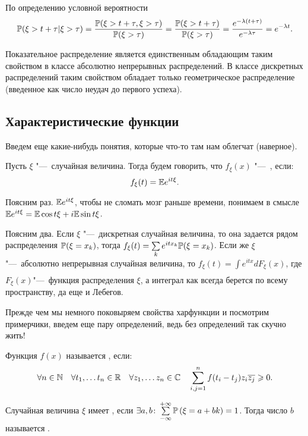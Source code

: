 \documentclass[../TV&MS.tex]{subfiles}
\begin{document}
	По определению условной вероятности
	$$\mathbb{P}(\xi > t + \tau | \xi > \tau) = \frac{\mathbb{P}(\xi > t + \tau, \xi > \tau)}{\mathbb{P}(\xi > \tau)} = 
	\frac{\mathbb{P}(\xi > t + \tau)}{\mathbb{P}(\xi > \tau)} = \frac{e^{-\lambda(t+\tau)}}{e^{-\lambda \tau}} = 
	e^{-\lambda t}.$$

	Показательное распределение является единственным обладающим таким свойством в классе абсолютно 
	непрерывных распределений. В классе дискретных распределений таким свойством обладает только 
	геометрическое распределение (введенное как число неудач до первого успеха).
	
\subsection{Характеристические функции}

	Введем еще какие-нибудь понятия, которые что-то там нам облегчат (наверное).

\begin{Def}
    Пусть $\xi$ "---~случайная величина. Тогда будем говорить, что 
    $f_\xi \left( x \right) $ "---~, если:
    \[
        f_\xi(t) = \mathbb{E} e^{it\xi}.
    \] 
\end{Def} 

	Поясним раз.  $\mathbb{E} e^{it\xi}$, чтобы не сломать мозг раньше времени, понимаем в смысле
	$\mathbb{E} e^{it\xi} = \mathbb{E} \cos{t\xi} + i\mathbb{E} \sin{t\xi}$.

	Поясним два. Если $\xi$ "---~дискретная случайная величина, то она задается рядом
	распределения $\mathbb{P}(\xi = x_k)$, тогда  $f_\xi(t) = \sum\limits_{k}^{} e^{itx_k} \mathbb{P}(\xi = x_k)$. 
	Если же $\xi$"---~абсолютно непрерывная случайная величина, то  
	$f_\xi(t) = \int\limits_{}^{} e^{itx} dF_\xi(x)$, где $F_\xi(x)$"---~функция распределения $\xi$, 
	а интеграл как всегда берется по всему пространству, да еще и Лебегов.

	Прежде чем мы немного поковыряем свойства харфункции и посмотрим примерчики,
	введем еще пару определений, ведь без определений так скучно жить!

\begin{Def}
    Функция $f(x)$ называется , если:
    \[
	    \forall n \in \mathbb{N} \quad \forall t_1, \ldots t_n \in \mathbb{R} \quad
    	\forall z_1, \ldots z_n \in \mathbb{C} \quad 
    	\sum\limits_{i,j=1}^{n} f(t_i - t_j) z_i \overline{z_j} \geqslant 0.
    \] 
\end{Def} 

\begin{Def}
    Случайная величина $\xi$ имеет , если
    $\exists a, b \colon \sum\limits_{-\infty}^{+\infty}
    \mathbb{P}\left(\xi = a + bk\right)= 1$. Тогда число $b$ называется 
    .
\end{Def} 
\end{document}
